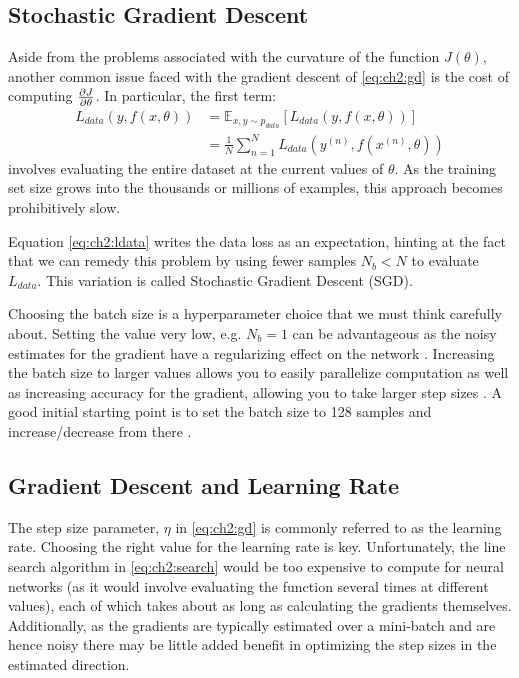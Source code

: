 \subsection{Stochastic Gradient Descent}
Aside from the problems associated with the curvature of the function $J(\theta)$,
another common issue faced with the gradient descent of \eqref{eq:ch2:gd} is the
cost of computing $\frac{\partial J}{\partial \theta}$. In particular, the first term:
\begin{align}\label{eq:ch2:ldata}
  L_{data}(y, f(x, \theta)) &= \mathbb{E}_{x,y \sim p_{data}}\left[ L_{data}(y, f(x, \theta))\right] \\
                            &= \frac{1}{N}\sum_{n=1}^N L_{data}\left(y^{(n)}, f(x^{(n)}, \theta)\right)
\end{align}
involves evaluating the entire dataset at the current values of $\theta$. As the
training set size grows into the thousands or millions of examples, this
approach becomes prohibitively slow.

Equation \eqref{eq:ch2:ldata} writes the data loss as an expectation, hinting at the fact that
we can remedy this problem by using fewer samples $N_b < N$ to evaluate $L_{data}$.
This variation is called Stochastic Gradient Descent (SGD).

Choosing the batch size is a hyperparameter choice that we must think carefully
about. Setting the value very low, e.g. $N_b = 1$ can be advantageous as the
noisy estimates for the gradient have a regularizing effect on the network
\cite{wilson_general_2003}. Increasing the batch size to larger values allows
you to easily parallelize computation as well as increasing accuracy for
the gradient, allowing you to take larger step sizes \cite{smith_dont_2017}.
A good initial starting point is to set the batch size to 128 samples and
increase/decrease from there \cite{goodfellow_deep_2016}.

\subsection{Gradient Descent and Learning Rate}
The step size parameter, $\eta$ in \eqref{eq:ch2:gd} is commonly referred to as
the learning rate. Choosing the right value for the learning rate is key.
Unfortunately, the line search algorithm in \eqref{eq:ch2:search} would be too
expensive to compute for neural networks (as it would involve evaluating the
function several times at different values), each of which takes about as long
as calculating the gradients themselves. Additionally, as the gradients are
typically estimated over a mini-batch and are hence noisy there may be
little added benefit in optimizing the step sizes in the estimated direction.

